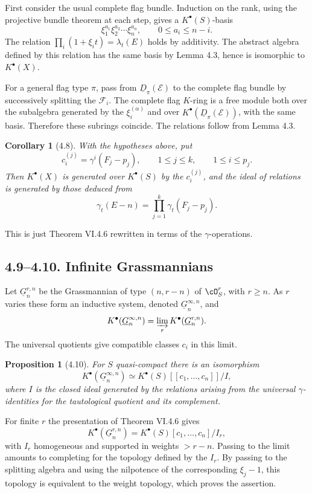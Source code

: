 \documentclass[11pt]{article}
\theoremstyle{plain}
\newtheorem{proposition}[theorem]{Proposition}
\newtheorem{corollary}[theorem]{Corollary}
\theoremstyle{definition}
\theoremstyle{remark}
\begin{document}
First consider the usual complete flag bundle. Induction on the rank, using the projective bundle theorem at each step, gives a $K^{\bullet}(S)$-basis
\[
\xi_1^{a_1}\xi_2^{a_2}\cdots\xi_n^{a_n},
\qquad
0\leq a_i\leq n-i.
\]
The relation $\prod_i(1+\xi_it)=\lambda_t(E)$ holds by additivity. The abstract algebra defined by this relation has the same basis by Lemma 4.3, hence is isomorphic to $K^{\bullet}(X)$.

For a general flag type $\pi$, pass from $\underline D_\pi(\mathcal E)$ to the complete flag bundle by successively splitting the $\mathcal F_i$. The complete flag $K$-ring is a free module both over the subalgebra generated by the $\xi_i^{(\alpha)}$ and over $K^{\bullet}(\underline D_\pi(\mathcal E))$, with the same basis. Therefore these subrings coincide. The relations follow from Lemma 4.3.

\begin{corollary}[4.8]
With the hypotheses above, put
\[
c_i^{(j)}=\gamma^i(F_j-p_j),
\qquad 1\leq j\leq k,
\qquad 1\leq i\leq p_j.
\]
Then $K^{\bullet}(X)$ is generated over $K^{\bullet}(S)$ by the $c_i^{(j)}$, and the ideal of relations is generated by those deduced from
\begin{equation}\label{eq:VI.4.8}
\gamma_t(E-n)=\prod_{j=1}^{k}\gamma_t(F_j-p_j).
\end{equation}
\end{corollary}
This is just Theorem VI.4.6 rewritten in terms of the $\gamma$-operations.

\subsection*{4.9--4.10. Infinite Grassmannians}
Let $\underline G_n^{r,n}$ be the Grassmannian of type $(n,r-n)$ of $\cO_S^r$, with $r\geq n$. As $r$ varies these form an inductive system, denoted $\underline G_n^{\infty,n}$, and
\[
K^{\bullet}(\underline G_n^{\infty,n})=\varinjlim_r K^{\bullet}(\underline G_n^{r,n}).
\]
The universal quotients give compatible classes $c_i$ in this limit.

\begin{proposition}[4.10]
For $S$ quasi-compact there is an isomorphism
\[
K^{\bullet}(\underline G_n^{\infty,n})\simeq K^{\bullet}(S)[[c_1,\ldots,c_n]]/I,
\]
where $I$ is the closed ideal generated by the relations arising from the universal $\gamma$-identities for the tautological quotient and its complement.
\end{proposition}

For finite $r$ the presentation of Theorem VI.4.6 gives
\[
K^{\bullet}(\underline G_n^{r,n})=K^{\bullet}(S)[c_1,\ldots,c_n]/I_r,
\]
with $I_r$ homogeneous and supported in weights $>r-n$. Passing to the limit amounts to completing for the topology defined by the $I_r$. By passing to the splitting algebra and using the nilpotence of the corresponding $\xi_j-1$, this topology is equivalent to the weight topology, which proves the assertion.
\end{document}
